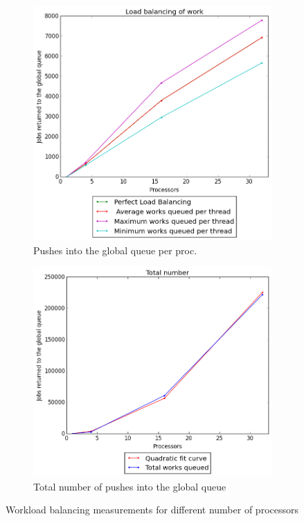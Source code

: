 \documentclass[a4paper]{article}
\begin{document}
\begin{figure}[htp!]
      \vspace{2em}

      \centering
      \begin{subfigure}{.5\textwidth}
        \centering
        \includegraphics[width=.99\textwidth]{../2 Analysis/Load/BFS_pushes.png}
        \caption{Pushes into the global queue per proc.}
        \label{fig:pushes}
      \end{subfigure}%
      \begin{subfigure}{.5\textwidth}
        \centering
        \includegraphics[width=.99\textwidth]{../2 Analysis/Load/BFS_total_pushes.png}
        \caption{Total number of pushes into the global queue}
        \label{fig:total}
      \end{subfigure}%
      \caption{Workload balancing measurements for different number of processors}
    \end{figure}
\end{document}
